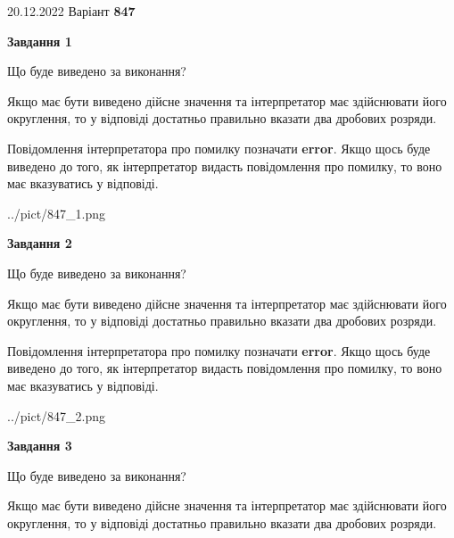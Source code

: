 \documentclass[12pt, ukrainian]{article}
\begin{document}
{20.12.2022 Варіант \No \textbf { 847 }\par}
{
\begin {Large}

{\begin {center}\textbf{Завдання 1}\end {center}}\par
Що буде виведено за виконання? \par

Якщо має бути виведено дійсне значення та інтерпретатор має здійснювати його округлення, 
то у відповіді достатньо правильно вказати два дробових розряди.

Повідомлення інтерпретатора про помилку позначати \textbf{error}.
Якщо щось буде виведено до того, як інтерпретатор видасть повідомлення про помилку, 
то воно має вказуватись у відповіді. \par

\begin{center}
	{../pict/847_1.png}
\end{center}
\newpage

{\begin {center}\textbf{Завдання 2}\end {center}}\par
Що буде виведено за виконання? \par

Якщо має бути виведено дійсне значення та інтерпретатор має здійснювати його округлення, 
то у відповіді достатньо правильно вказати два дробових розряди.

Повідомлення інтерпретатора про помилку позначати \textbf{error}.
Якщо щось буде виведено до того, як інтерпретатор видасть повідомлення про помилку, 
то воно має вказуватись у відповіді. \par

\begin{center}
	{../pict/847_2.png}
\end{center}
\newpage

{\begin {center}\textbf{Завдання 3}\end {center}}\par
Що буде виведено за виконання? \par

Якщо має бути виведено дійсне значення та інтерпретатор має здійснювати його округлення, 
то у відповіді достатньо правильно вказати два дробових розряди.


\end{Large}}
\end{document}
